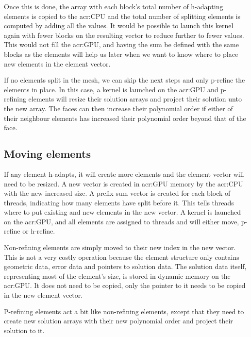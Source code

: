 Once this is done, the array with each block's total number of h-adapting elements is copied to the
\acrshort{acr:CPU} and the total number of splitting elements is computed by adding all the values.
It would be possible to launch this kernel again with fewer blocks on the resulting vector to reduce
further to fewer values. This would not fill the \acrshort{acr:GPU}, and having the sum be defined
with the same blocks as the elements will help us later when we want to know where to place new
elements in the element vector.

If no elements split in the mesh, we can skip the next steps and only p-refine the elements in
place. In this case, a kernel is launched on the \acrshort{acr:GPU} and p-refining elements will
resize their solution arrays and project their solution unto the new array. The faces can then
increase their polynomial order if either of their neighbour elements has increased their polynomial
order beyond that of the face. 

\subsection{Moving elements}\label{subsection:adaptive_mesh_refinement:implementation:moving_elements}


If any element h-adapts, it will create more elements and the element vector will need to be
resized. A new vector is created in \acrshort{acr:GPU} memory by the \acrshort{acr:CPU} with the new
increased size. A prefix sum vector is created for each block of threads, indicating how many
elements have split before it. This tells threads where to put existing and new elements in the new
vector. A kernel is launched on the \acrshort{acr:GPU}, and all elements are assigned to threads and
will either move, p-refine or h-refine.

Non-refining elements are simply moved to their new index in the new vector. This is not a very
costly operation because the element structure only contains geometric data, error data and pointers
to solution data. The solution data itself, representing most of the element's size, is stored in
dynamic memory on the \acrshort{acr:GPU}. It does not need to be copied, only the pointer to it
needs to be copied in the new element vector. 

P-refining elements act a bit like non-refining elements, except that they need to create new
solution arrays with their new polynomial order and project their solution to it.

